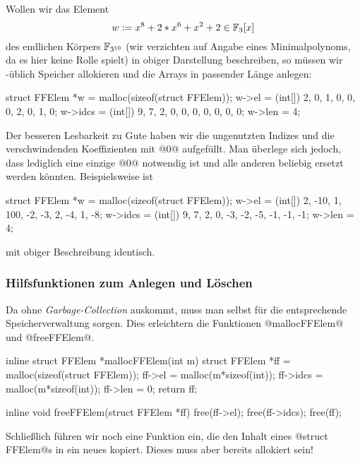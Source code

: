 \begin{beispiel}
  Wollen wir das Element 
  \[ w := x^8 + 2*x^6 + x^2 + 2 \in \mathbb{F}_3[x]\]
  des endlichen Körpers $\mathbb{F}_{3^{10}}$ 
  (wir verzichten auf Angabe eines Minimalpolynoms, da es hier keine
  Rolle spielt) in obiger Darstellung beschreiben, so müssen wir \Clang-üblich
  Speicher allokieren und die Arrays in passender Länge anlegen:
  \begin{cexample}
    struct FFElem *w = malloc(sizeof(struct FFElem));
    w->el = (int[]) {2, 0, 1, 0, 0, 0, 2, 0, 1, 0};
    w->idcs = (int[]) {9, 7, 2, 0, 0, 0, 0, 0, 0, 0};
    w->len = 4;
  \end{cexample}
  Der besseren Lesbarkeit zu Gute haben wir die ungenutzten Indizes und die 
  verschwindenden Koeffizienten mit @0@ aufgefüllt. Man überlege sich jedoch,
  dass lediglich eine einzige @0@ notwendig ist und alle anderen 
  beliebig ersetzt werden könnten. Beispielsweise ist
  \begin{cexample}
    struct FFElem *w = malloc(sizeof(struct FFElem));
    w->el = (int[]) {2, -10, 1, 100, -2, -3, 2, -4, 1, -8};
    w->idcs = (int[]) {9, 7, 2, 0, -3, -2, -5, -1, -1, -1};
    w->len = 4;
  \end{cexample}
  mit obiger Beschreibung identisch.
\end{beispiel}


\subsubsection{Hilfsfunktionen zum Anlegen und Löschen}

Da \Clang ohne \emph{Garbage-Collection} auskommt, muss man selbst für die
entsprechende Speicherverwaltung sorgen. Dies erleichtern die Funktionen
@mallocFFElem@ und @freeFFElem@.

\begin{ccode}[caption={Aus \url{../Sage/enumeratePCNs.c}},
  firstnumber=30]
inline struct FFElem *mallocFFElem(int m){
    struct FFElem *ff = malloc(sizeof(struct FFElem));
    ff->el = malloc(m*sizeof(int));
    ff->idcs = malloc(m*sizeof(int));
    ff->len = 0;
    return ff;
}
\end{ccode}

\begin{ccode}[caption={Aus \url{../Sage/enumeratePCNs.c}},
  firstnumber=37]
inline void freeFFElem(struct FFElem *ff){
    free(ff->el);
    free(ff->idcs);
    free(ff);
}
\end{ccode}

Schließlich führen wir noch eine Funktion ein, die den Inhalt eines
@struct FFElem@s in ein neues kopiert. Dieses muss aber bereits allokiert sein!


